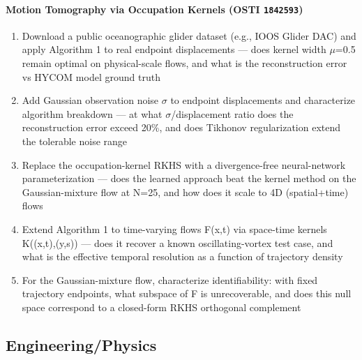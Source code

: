 \documentclass[11pt]{article}
\begin{document}
\paragraph{Motion Tomography via Occupation Kernels \textnormal{\small(OSTI \texttt{1842593})}}
\begin{enumerate}[leftmargin=1.6em,itemsep=0.2em,topsep=0.2em,label=Q\arabic*.]
\item Download a public oceanographic glider dataset (e.g., IOOS Glider DAC) and apply Algorithm 1 to real endpoint displacements --- does kernel width $\mu$=0.5 remain optimal on physical-scale flows, and what is the reconstruction error vs HYCOM model ground truth
\item Add Gaussian observation noise $\sigma$ to endpoint displacements and characterize algorithm breakdown --- at what $\sigma$/displacement ratio does the reconstruction error exceed 20\%, and does Tikhonov regularization extend the tolerable noise range
\item Replace the occupation-kernel RKHS with a divergence-free neural-network parameterization --- does the learned approach beat the kernel method on the Gaussian-mixture flow at N=25, and how does it scale to 4D (spatial+time) flows
\item Extend Algorithm 1 to time-varying flows F(x,t) via space-time kernels K((x,t),(y,s)) --- does it recover a known oscillating-vortex test case, and what is the effective temporal resolution as a function of trajectory density
\item For the Gaussian-mixture flow, characterize identifiability: with fixed trajectory endpoints, what subspace of F is unrecoverable, and does this null space correspond to a closed-form RKHS orthogonal complement
\end{enumerate}
\subsection*{Engineering/Physics}
\end{document}
